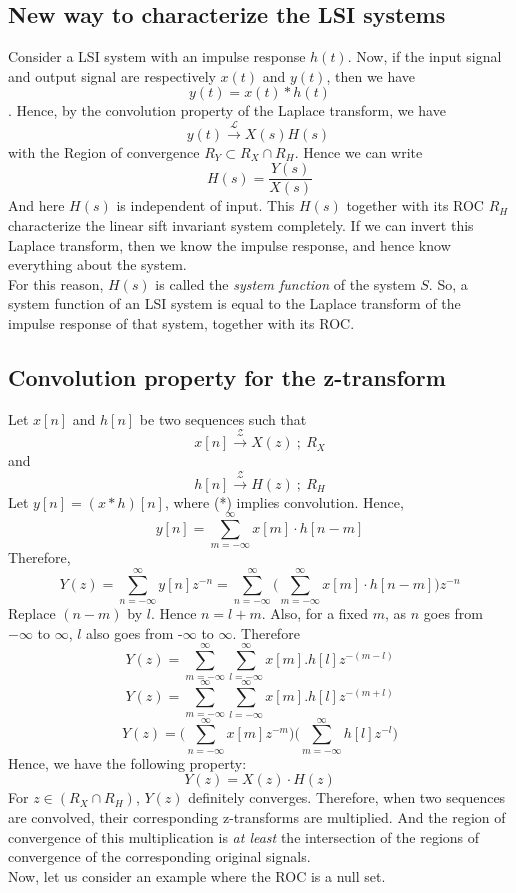 {\subsection{New way to characterize the LSI systems}
Consider a LSI system with an impulse response $h(t)$. Now, if the input signal and output signal are respectively $x(t)$ and $y(t)$, then we have \[y(t)=x(t)*h(t) \].
Hence, by the convolution property of the Laplace transform, we have
\[
y(t) \xrightarrow{\ \mathcal{L}\ } X(s)H(s)\  
\]
with the Region of convergence $R_Y \subset R_X \cap R_H $. Hence we can write 
\[ 
H(s) = \frac{Y(s)}{X(s)}
\]
And here $H(s)$ is independent of input. This $H(s)$ together with its ROC $R_H$ characterize the linear sift invariant system completely.
If we can invert this Laplace transform, then we know the impulse response, and hence know everything about the system.\\
For this reason, $H(s)$ is called the \emph{system function} of the system $S$. So, a system function of an LSI system is equal to the Laplace transform of the impulse response of that system, together with its ROC.
\subsection{Convolution property for the z-transform}
Let $x[n]$ and $h[n]$ be two sequences such that
\[
x[n] \xrightarrow{\ \mathcal{Z}\ } X(z)\ ;\ R_X
\]
and
\[
h[n] \xrightarrow{\ \mathcal{Z}\ } H(z)\ ;\ R_H
\]
Let $y[n] = (x*h)[n]$, where (*) implies convolution. Hence,
\[
y[n] = \sum\limits_{m = -\infty}^{\infty} x[m] \cdot h[n-m]
\]
Therefore,
\[
Y(z) = \sum\limits_{n=-\infty}^{\infty} y[n]z^{-n} = \sum\limits_{n = -\infty}^{\infty}\Big(\sum\limits_{m = -\infty}^{\infty} x[m]\cdot h[n-m]\Big) z^{-n}
\]
Replace $(n-m)$ by $l$. Hence $n= l+m$. Also, for a fixed $m$, as $n$ goes from $-\infty$ to $\infty$, $l$ also goes from -$\infty$ to $\infty$. Therefore
\[
Y(z)= \sum\limits_{m=-\infty}^{\infty}{\sum\limits_{l=-\infty}^{\infty} x[m].h[l]} z^{-(m-l)}
\]
\[
Y(z)= \sum\limits_{m=-\infty}^{\infty}{\sum\limits_{l=-\infty}^{\infty} x[m].h[l]} z^{-(m+l)}
\]
\[
Y(z)= \Big({\sum\limits_{n=-\infty}^{\infty} x[m]z^{-m}} \Big) \Big({{ \sum\limits_{m=-\infty}^{\infty} h[l]} z^{-l}}\Big)
\]
Hence, we have the following property:
\[
Y(z)=X(z) \cdot H(z)
\]
For $z\in (R_X\cap R_H)$, $Y(z)$ definitely converges. Therefore, when two sequences are convolved, their corresponding z-transforms are multiplied. And the region of convergence of this multiplication is \emph{at least} the intersection of the regions of convergence of the corresponding original signals.\\
Now, let us consider an example where the ROC is a null set.
}
